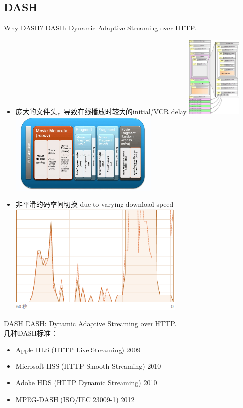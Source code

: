 \documentclass{beamer}
\begin{document}
\subsection{DASH}
\begin{frame}{Why DASH?}
DASH: Dynamic Adaptive Streaming over HTTP.
\pause
\begin{itemize}
\item 庞大的文件头，导致在线播放时较大的initial/VCR delay
\includegraphics[height=4cm]{fig/MP4_boxes_detail.jpg}
\includegraphics[height=4cm]{fig/fragmented_mp4.jpg}
\end{itemize}
\end{frame}
\begin{frame}
\begin{itemize}
\item 非平滑的码率间切换 due to varying download speed \\
\includegraphics[height=5.4cm]{fig/download_speed.png}
\end{itemize}
\end{frame}
\begin{frame}{DASH}
DASH: Dynamic Adaptive Streaming over HTTP. \\
几种DASH标准：
\pause
\begin{itemize}
\item Apple HLS (HTTP Live Streaming) 2009
\item Microsoft HSS (HTTP Smooth Streaming) 2010
\item Adobe HDS (HTTP Dynamic Streaming) 2010
\item MPEG-DASH (ISO/IEC 23009-1) 2012
\end{itemize}
\end{frame}
\end{document}

